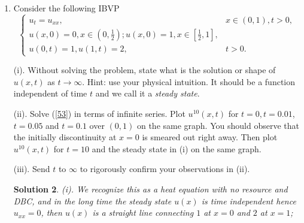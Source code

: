 \documentclass[6pt]{article}
\newtheorem{solution}{Solution}
\numberwithin{equation}{section}
\begin{document}
\begin{enumerate}
\begin{solution}
I would like to put a few more remarks here.  As $t\rightarrow \infty$, one expects that $u(x,t)$ converges to some function that depends on $x$ but not on time $t$ (now that the limit of $t$ is taken).  This function or solution is called the stationary or steady state of the problem since it stays still.  Therefore to study the steady state of the problem, we set $u_t=0$ and collect that $u_{xx}+x-\pi=0$ in $(0\pi)$.  Solving this problem readily gives us
\[u(x)=-\frac{x^3}{6}+\frac{\pi x^2}{2}+C_1x+C_2\]
for some constants $C_i$ to be determined.  To evaluate these constants, we apply the boundary conditions and can find that $C_1=-(\frac{\pi^2}{3}+1)$ and $C_2=\pi$.  Note that the initial condition does not matter at all because whatever the initial data are, the eventual state would be $u(x)$ given above.  I would like to further mention that for this particular problem the steady state is quite simple since it is unique and can be explicitly obtained.  However, for general equations in particular systems of equations, the steady state does not have to be unique in general since a different initial data may lead to a different steady state.
\end{solution}

\item Consider the following IBVP
\begin{equation}\label{53}
\left\{
\begin{array}{ll}
u_t=u_{xx},& x\in(0,1),t>0,\\
u(x,0)=0, x\in(0,\frac{1}{2}); u(x,0)=1, x\in[\frac{1}{2},1],\\
u(0,t)=1, u(1,t)=2, &t>0.
\end{array}
\right.
\end{equation}

(i).  Without solving the problem, state what is the solution or shape of $u(x,t)$ as $t\rightarrow \infty$.  Hint: use your physical intuition.  It should be a function independent of time $t$ and we call it a \emph{steady state}.

(ii).  Solve (\ref{53}) in terms of infinite series.  Plot $u^{10}(x,t)$ for $t=0, t=0.01$, $t=0.05$ and $t=0.1$ over $(0,1)$ on the same graph.  You should observe that the initially discontinuity at $x=0$ is smeared out right away.  Then plot $u^{10}(x,t)$ for $t=10$ and the steady state in (i) on the same graph.

(iii).  Send $t$ to $\infty$ to rigorously confirm your observations in (ii).
\begin{solution}
(i).  We recognize this as a heat equation with no resource and DBC, and in the long time the steady state $u(x)$ is time independent hence $u_{xx}=0$, then $u(x)$ is a straight line connecting $1$ at $x=0$ and $2$ at $x=1$;


\end{solution}
\end{enumerate}
\end{document}
